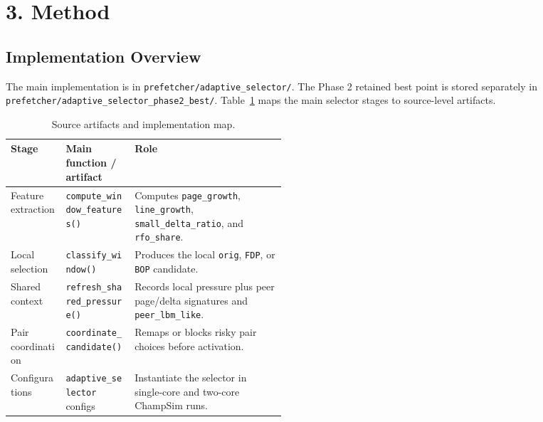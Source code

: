 \documentclass[10pt,letterpaper]{article}
\newcommand{\code}[1]{\texttt{#1}}
\begin{document}
\section*{3. Method}

\subsection*{Implementation Overview}

The main implementation is in \code{prefetcher/adaptive\_selector/}. The
Phase 2 retained best point is stored separately in
\code{prefetcher/adaptive\_selector\_phase2\_best/}. Table~\ref{tab:impl}
maps the main selector stages to source-level artifacts.

\begin{table}[!htbp]
\centering
\scriptsize
\caption{Source artifacts and implementation map.}
\label{tab:impl}
\begin{tabularx}{\linewidth}{@{}p{0.20\linewidth}p{0.25\linewidth}X@{}}
\toprule
Stage & Main function / artifact & Role \\
\midrule
Feature extraction & \code{compute\_window\_features()} & Computes \code{page\_growth}, \code{line\_growth}, \code{small\_delta\_ratio}, and \code{rfo\_share}. \\
Local selection & \code{classify\_window()} & Produces the local \code{orig}, \code{FDP}, or \code{BOP} candidate. \\
Shared context & \code{refresh\_shared\_pressure()} & Records local pressure plus peer page/delta signatures and \code{peer\_lbm\_like}. \\
Pair coordination & \code{coordinate\_candidate()} & Remaps or blocks risky pair choices before activation. \\
Configurations & \code{adaptive\_selector} configs & Instantiate the selector in single-core and two-core ChampSim runs. \\
\bottomrule
\end{tabularx}
\end{table}
\end{document}
